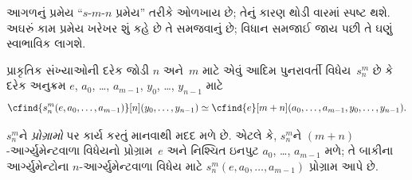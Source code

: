 \documentclass[../../../include/open-logic-section]{subfiles}
\begin{document}

\begin{explain}
આગળનું પ્રમેય ``$s$-$m$-$n$ પ્રમેય'' તરીકે ઓળખાય છે; તેનું કારણ
થોડી વારમાં સ્પષ્ટ થશે. અઘરું કામ પ્રમેય ખરેખર શું કહે છે તે
સમજવાનું છે; વિધાન સમજાઈ જાય પછી તે ઘણું સ્વાભાવિક લાગશે.
\end{explain}

\begin{thm}
  પ્રાકૃતિક સંખ્યાઓની દરેક જોડી $n$ અને~$m$ માટે એવું આદિમ
  પુનરાવર્તી વિધેય~$s^m_n$ છે કે દરેક અનુક્રમ
  $e$, $a_0$, \dots, $a_{m-1}$, $y_0$, \dots, $y_{n-1}$ માટે
  \[
  \cfind{s^m_n(e, a_0, \dots, a_{m-1})}[n](y_0, \dots, y_{n-1}) \simeq
  \cfind{e}[m+n](a_0, \dots, a_{m-1}, y_0, \dots, y_{n-1}).
\]
\end{thm}

\begin{explain}
$s^m_n$ને \emph{પ્રોગ્રામો} પર કાર્ય કરતું માનવાથી મદદ મળે છે.
એટલે કે, $s^m_n$ને $(m+n)$-આર્ગ્યુમેન્ટવાળા વિધેયનો
પ્રોગ્રામ~$e$ અને નિશ્ચિત ઇનપુટ $a_0$, \dots, $a_{m-1}$ મળે;
તે બાકીના આર્ગ્યુમેન્ટોના $n$-આર્ગ્યુમેન્ટવાળા વિધેય માટે
$s^m_n(e,a_0,\dots,a_{m-1})$ પ્રોગ્રામ આપે છે.
\end{explain}
\end{document}
